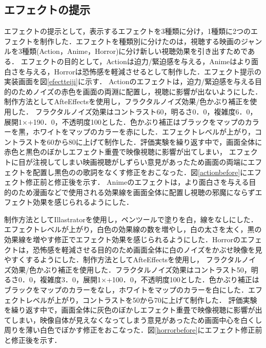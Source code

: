 \subsection{エフェクトの提示}
エフェクトの提示として，表示するエフェクトを3種類に分け，1種類に2つのエフェクトを制作した．エフェクトを種類別に分けたのは，視聴する映画のジャンルを3種類(Action，Anime，Horror)に分け新しい視聴効果を引き出すためである．
エフェクトの目的として，Actionは迫力/緊迫感を与える，Animeはより面白さを与える，Horrorは恐怖感を軽減させるとして制作した．エフェクト提示の実装画面を図\ref{efectteiji}に示す．
Actionのエフェクトは，迫力/緊迫感を与える目的のためノイズの赤色を画面の両淵に配置し，視聴に影響が出ないようにした．制作方法としてAfteEffectsを使用し，フラクタルノイズ効果/色かぶり補正を使用した．
フラクタルノイズ効果はコントラスト60，明るさ0．0，複雑度6．0，展開1×+190．0，不透明度100とした．色かぶり補正はブラックをマップのカラーを黒，ホワイトをマップのカラーを赤にした．エフェクトレベルが上がり，コントラストを60から80に上げて制作した．評価実験を繰り返す中で，画面全体に赤色と黒色のぼかしエフェクト重畳で映像視聴に影響が出てしまい，
エフェクトに目が注視してしまい映画視聴がしずらい意見があったため画面の両端にエフェクトを配置し黒色のの歌詞をなくす修正をおこなった．図\ref{actionbefore}にエフェクト修正前と修正後を示す．
Animeのエフェクトは，より面白さを与える目的のため漫画などで使用される効果線を画面全体に配置し視聴の邪魔にならずエフェクト効果を感じられるようにした．
 
制作方法としてIllastratorを使用し，ペンツールで塗りを白，線をなしにした．エフェクトレベルが上がり，白色の効果線の数を増やし，白の太さを太く，黒の効果線を増やす修正でエフェクト効果を感じられるようにした．Horrorのエフェクトは，恐怖感を軽減させる目的のため画面全体に白のノイズをかぶせ映像を見やすくするようにした．制作方法としてAfteEffectsを使用し，
フラクタルノイズ効果/色かぶり補正を使用した．フラクタルノイズ効果はコントラスト50，明るさ0．0，複雑度3．0，展開1×+100．0，不透明度100とした．色かぶり補正はブラックをマップのカラーをなし，ホワイトをマップのカラーを白にした．エフェクトレベルが上がり，コントラストを50から70に上げて制作した．
評価実験を繰り返す中で，画面全体に灰色のぼかしエフェクト重畳で映像視聴に影響が出てしまい，映像自体が見えなくなってしまう意見があったため画面中心を白くし周りを薄い白色でぼかす修正をおこなった．図\ref{horrorbefore}にエフェクト修正前と修正後を示す．
 
